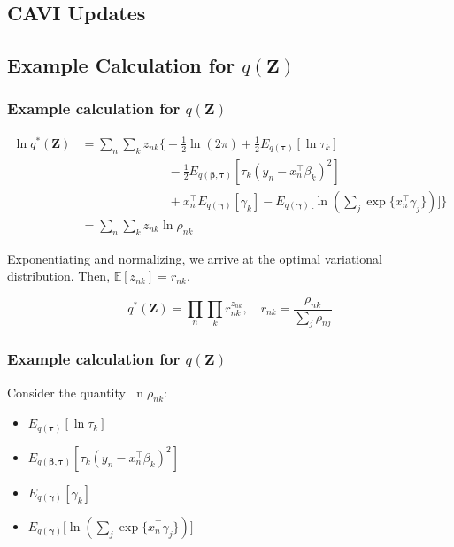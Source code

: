 \documentclass{beamer}
\newcommand{\tr}{\intercal}
\newcommand{\E}{\mathbb{E}}
\begin{document}
\subsection{CAVI Updates}

\subsection{Example Calculation for $q(\mathbf{Z})$}

\begin{frame}
\frametitle{Example calculation for $q(\mathbf{Z})$}

\begin{align*}
	\ln q^{*}(\mathbf{Z}) &= \sum_n \sum_k z_{nk} \Bigg\{  -\frac{1}{2}\ln(2\pi) + \frac{1}{2} E_{q(\boldsymbol\tau)}[ \ln \tau_k ] \\
	& \qquad \qquad \qquad \quad- \frac{1}{2} E_{q(\boldsymbol\beta, \boldsymbol\tau)}[\tau_k (y_n - x_n^{\tr}\beta_k)^2] \\ 
	&\qquad \qquad \qquad \quad + x_n^{\tr}E_{q(\boldsymbol\gamma)}[\gamma_k] - E_{q(\boldsymbol\gamma)}\Bigg[\ln \left( \sum_{j} \exp \{ x_n^{\tr} \gamma_j \}\right)\Bigg]\Bigg\} \\
	&= \sum_n \sum_k z_{nk} \ln \rho_{nk}
\end{align*}

Exponentiating and normalizing, we arrive at the optimal variational distribution. Then, $\E[z_{nk}] = r_{nk}$.

\begin{equation} \label{eq:q_z}
	q^{*}(\mathbf{Z}) = \prod_{n} \prod_{k} r_{nk}^{z_{nk}}, \quad r_{nk} = \frac{\rho_{nk}}{\sum_{j} \rho_{nj}}
\end{equation}


\end{frame}


\begin{frame}
\frametitle{Example calculation for $q(\mathbf{Z})$}

Consider the quantity $\ln \rho_{nk}$:

\begin{itemize}
	\item $E_{q(\boldsymbol\tau)}[ \ln \tau_k ]$ 
\end{itemize}

\begin{itemize}
	\item $E_{q(\boldsymbol\beta, \boldsymbol\tau)}[\tau_k (y_n - x_n^{\tr}\beta_k)^2] $
\end{itemize}

\begin{itemize}
	\item $E_{q(\boldsymbol\gamma)}[\gamma_k]$
\end{itemize}


\begin{itemize}
	\item $E_{q(\boldsymbol\gamma)}\Bigg[\ln \left( \sum_{j} \exp \{ x_n^{\tr} \gamma_j \}\right)\Bigg]$
\end{itemize}


\end{frame}
\end{document}
